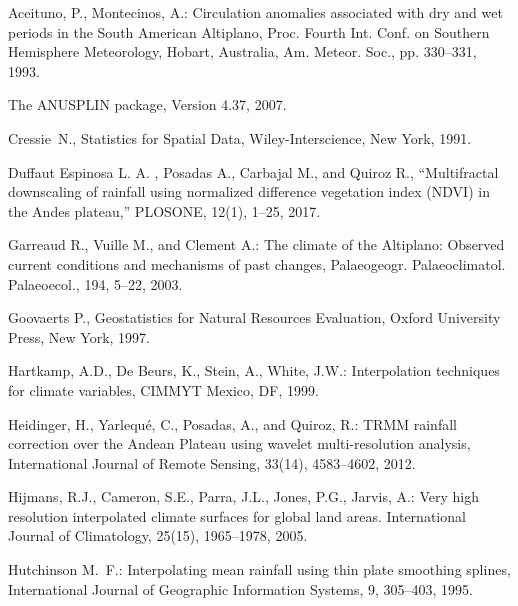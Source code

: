 \documentclass[10pt,letterpaper,conference]{ieeeconf}
\begin{document}
\begin{thebibliography}{999}

 Aceituno, P., 
Montecinos, A.: Circulation anomalies associated with dry and wet 
periods in the South American Altiplano, Proc. Fourth Int. Conf. on Southern 
Hemisphere Meteorology, Hobart, Australia, Am. Meteor. Soc., pp. 330--331, 1993.

 The ANUSPLIN package, Version 4.37, 2007.

 Cressie~N., Statistics for Spatial Data, 
Wiley-Interscience, New York, 1991.

 Duffaut Espinosa L. A. , Posadas  A., Carbajal M., 
and Quiroz R., ``Multifractal downscaling of rainfall using normalized 
difference vegetation 
index (NDVI) in the Andes plateau,'' PLOSONE, 12(1), 1--25, 2017.

 Garreaud R., Vuille M., 
and Clement A.: The climate of the Altiplano: Observed current conditions and 
mechanisms of past changes, Palaeogeogr. Palaeoclimatol. Palaeoecol., 194, 
5--22, 2003.



 Goovaerts P., Geostatistics for Natural Resources 
Evaluation, Oxford University Press, New York, 1997.


 Hartkamp, A.D., De Beurs, 
K., Stein, A., White, J.W.: Interpolation techniques for climate variables, 
CIMMYT Mexico, DF, 1999.


 Heidinger, H., Yarlequ\'e, 
C., Posadas, A., and Quiroz, R.: TRMM rainfall correction over the Andean 
Plateau using wavelet multi-resolution analysis, International Journal of 
Remote Sensing, 33(14), 4583--4602, 2012.

 Hijmans, R.J., Cameron, 
S.E., Parra, J.L., Jones, P.G., Jarvis, A.: Very 
high resolution interpolated climate surfaces for global land areas. 
International Journal of Climatology, 25(15), 1965--1978, 2005.

 Hutchinson M.~F.: Interpolating mean
rainfall using thin plate smoothing splines, International Journal of 
Geographic Information Systems, 9, 305--403, 1995.
 

\end{thebibliography}
\end{document}
